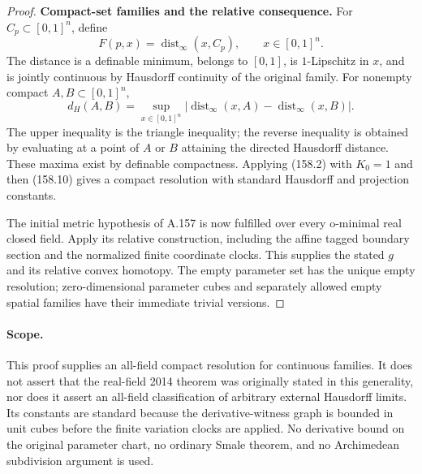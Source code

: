 \begin{proof}
\textbf{Compact-set families and the relative consequence.}
For \(C_p\subset[0,1]^n\), define
\[
 F(p,x)=\operatorname{dist}_\infty(x,C_p),
 \qquad x\in[0,1]^n.
\]
The distance is a definable minimum, belongs to \([0,1]\), is
\(1\)-Lipschitz in \(x\), and is jointly continuous by Hausdorff
continuity of the original family. For nonempty compact
\(A,B\subset[0,1]^n\),
\[
 d_H(A,B)=
 \sup_{x\in[0,1]^n}
 |\operatorname{dist}_\infty(x,A)
             -\operatorname{dist}_\infty(x,B)|.
 \tag{158.10}
\]
The upper inequality is the triangle inequality; the reverse
inequality is obtained by evaluating at a point of \(A\) or
\(B\) attaining the directed Hausdorff distance. These
maxima exist by definable compactness. Applying (158.2) with
\(K_0=1\) and then (158.10) gives a compact resolution with
standard Hausdorff and projection constants.

The initial metric hypothesis of A.157 is now fulfilled over
every o-minimal real closed field. Apply its relative
construction, including the affine tagged boundary section
and the normalized finite coordinate clocks. This supplies
the stated \(g\) and its relative convex homotopy. The empty
parameter set has the unique empty resolution; zero-dimensional
parameter cubes and separately allowed empty spatial families
have their immediate trivial versions.
\end{proof}

\paragraph{Scope.}
This proof supplies an all-field compact resolution for continuous
families. It does not assert that the real-field 2014 theorem was
originally stated in this generality, nor does it assert an all-field
classification of arbitrary external Hausdorff limits. Its constants
are standard because the derivative-witness graph is bounded in unit
cubes before the finite variation clocks are applied. No derivative
bound on the original parameter chart, no ordinary Smale theorem,
and no Archimedean subdivision argument is used.
